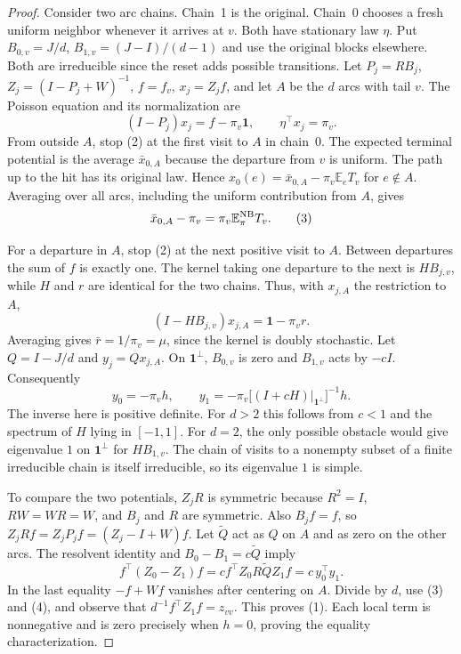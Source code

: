 \documentclass[11pt]{article}
\newcommand{\one}{\mathbf 1}
\newcommand{\E}{\mathbb E}
\begin{document}
\begin{proof}
Consider two arc chains. Chain~1 is the original. Chain~0 chooses a fresh uniform neighbor whenever it arrives at $v$. Both have stationary law $\eta$. Put $B_{0,v}=J/d$, $B_{1,v}=(J-I)/(d-1)$ and use the original blocks elsewhere. Both are irreducible since the reset adds possible transitions. Let $P_j=RB_j$, $Z_j=(I-P_j+W)^{-1}$, $f=f_v$, $x_j=Z_j f$, and let $A$ be the $d$ arcs with tail $v$. The Poisson equation and its normalization are
\[
 (I-P_j)x_j=f-\pi_v\one,\qquad \eta^\top x_j=\pi_v .
 \tag{2}
\]
From outside $A$, stop (2) at the first visit to $A$ in chain~0. The expected terminal potential is the average $\bar x_{0,A}$ because the departure from $v$ is uniform. The path up to the hit has its original law. Hence $x_0(e)=\bar x_{0,A}-\pi_v\E_e T_v$ for $e\notin A$. Averaging over all arcs, including the uniform contribution from $A$, gives
\[
                \bar x_{0,A}-\pi_v=\pi_v\E^{\rm NB}_\pi T_v.
 \tag{3}
\]

For a departure in $A$, stop (2) at the next positive visit to $A$. Between departures the sum of $f$ is exactly one. The kernel taking one departure to the next is $HB_{j,v}$, while $H$ and $r$ are identical for the two chains. Thus, with $x_{j,A}$ the restriction to $A$,
\[
       (I-HB_{j,v})x_{j,A}=\one-\pi_v r .
\]
Averaging gives $\bar r=1/\pi_v=\mu$, since the kernel is doubly stochastic. Let $Q=I-J/d$ and $y_j=Qx_{j,A}$. On $\one^\perp$, $B_{0,v}$ is zero and $B_{1,v}$ acts by $-cI$. Consequently
\[
 y_0=-\pi_v h,\qquad
 y_1=-\pi_v\big[(I+cH)|_{\one^\perp}\big]^{-1}h .
 \tag{4}
\]
The inverse here is positive definite. For $d>2$ this follows from $c<1$ and the spectrum of $H$ lying in $[-1,1]$. For $d=2$, the only possible obstacle would give eigenvalue $1$ on $\one^\perp$ for $HB_{1,v}$. The chain of visits to a nonempty subset of a finite irreducible chain is itself irreducible, so its eigenvalue $1$ is simple.

To compare the two potentials, $Z_jR$ is symmetric because $R^2=I$, $RW=WR=W$, and $B_j$ and $R$ are symmetric. Also $B_j f=f$, so $Z_jRf=Z_jP_jf=(Z_j-I+W)f$. Let $\widetilde Q$ act as $Q$ on $A$ and as zero on the other arcs. The resolvent identity and $B_0-B_1=c\widetilde Q$ imply
\[
 f^\top (Z_0-Z_1)f
 =c f^\top Z_0 R\widetilde Q Z_1 f
 =c\, y_0^\top y_1 .
\]
In the last equality $-f+Wf$ vanishes after centering on $A$. Divide by $d$, use (3) and (4), and observe that $d^{-1} f^\top Z_1 f=z_{vv}$. This proves (1). Each local term is nonnegative and is zero precisely when $h=0$, proving the equality characterization.
\end{proof}
\end{document}
